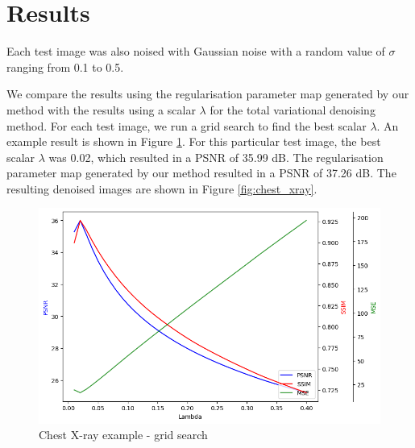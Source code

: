 \documentclass[12pt]{article}
\begin{document}




\section{Results}
Each test image was also noised with Gaussian noise with a random value of $\sigma$ ranging from 0.1 to 0.5.

We compare the results using the regularisation parameter map generated by
our method with the results using a scalar $\lambda$ for the total variational denoising method.
For each test image, we run a grid search to find the best scalar $\lambda$.
An example result is shown in Figure \ref{fig:line_plots}.
For this particular test image, the best scalar $\lambda$ was 0.02, which resulted in a PSNR of 35.99 dB.
The regularisation parameter map generated by our method resulted in a PSNR of 37.26 dB.
The resulting denoised images are shown in Figure \ref{fig:chest_xray}.

\begin{figure}[h]
  \centering
  \includegraphics[width=0.6\linewidth]{images//chest_xray/chest_xray-line_plots.png}
      \caption{Chest X-ray example - grid search}
  \label{fig:line_plots}
\end{figure}




  
      
\end{document}
